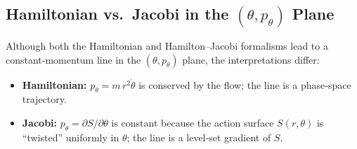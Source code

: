 \subsection{Hamiltonian vs.\ Jacobi in the \((\theta,p_\theta)\) Plane}

Although both the Hamiltonian and Hamilton–Jacobi formalisms lead to a constant‐momentum line in the \((\theta,p_\theta)\) plane, the interpretations differ:

\begin{itemize}
  \item \textbf{Hamiltonian:}  \(p_\theta = m\,r^2\dot\theta\) is conserved by the flow; the line is a phase‐space trajectory.
  \item \textbf{Jacobi:}  \(p_\theta = \partial S/\partial \theta\) is constant because the action surface \(S(r,\theta)\) is “twisted” uniformly in \(\theta\); the line is a level‐set gradient of \(S\).
\end{itemize}




